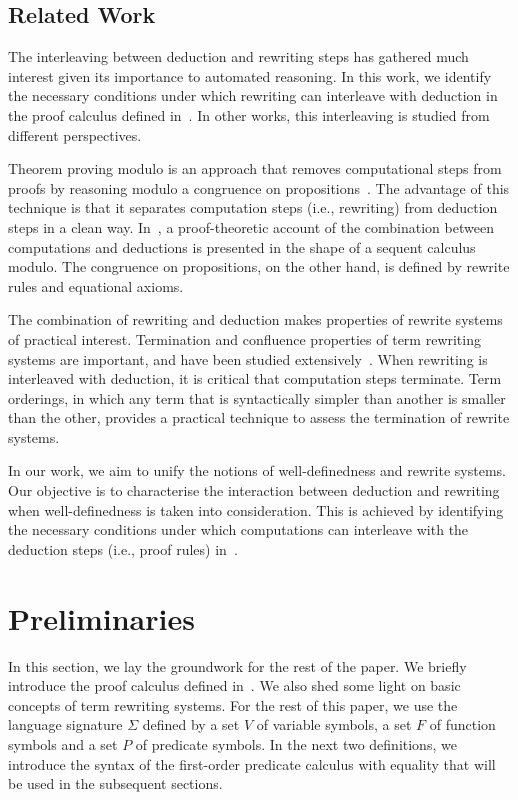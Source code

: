 \documentclass[copyright]{eptcs}
\begin{document}
\subsection{Related Work}
The interleaving between deduction and rewriting steps has gathered much interest given its importance to automated reasoning. In this work, we identify the necessary conditions under which rewriting can interleave with deduction in the proof calculus defined in~\cite{icfemMehta08}. In other works, this interleaving is studied from different perspectives.
\par
Theorem proving modulo is an approach that removes computational steps from proofs by reasoning modulo a congruence on propositions~\cite{949773}. The advantage of this technique is that it separates computation steps (i.e., rewriting) from deduction steps in a clean way. In~\cite{949773}, a proof-theoretic account of the combination between computations and deductions is presented in the shape of a sequent calculus modulo. The congruence on propositions, on the other hand, is defined by rewrite rules and equational axioms.
\par
The combination of rewriting and deduction makes properties of rewrite systems of practical interest. Termination and confluence properties of term rewriting systems are important, and have been studied extensively~\cite{280474,303448}. When rewriting is interleaved with deduction, it is critical that computation steps terminate. Term orderings, in which any term that is syntactically simpler than another is smaller than the other, provides a practical technique to assess the termination of rewrite systems.
\par
In our work, we aim to unify the notions of well-definedness and rewrite systems. Our objective is to characterise the interaction between deduction and rewriting when well-definedness is taken into consideration. This is achieved by identifying the necessary conditions under which computations can interleave with the deduction steps (i.e., proof rules) in~\cite{icfemMehta08}.

\section{Preliminaries}\label{pre}
In this section, we lay the groundwork for the rest of the paper. We briefly introduce the proof calculus defined in~\cite{icfemMehta08}. We also shed some light on basic concepts of term rewriting systems. For the rest of this paper, we use the language signature $\Sigma$ defined by a set $V$ of variable symbols, a set $F$ of function symbols and a set $P$ of predicate symbols. In the next two definitions, we introduce the syntax of the first-order predicate calculus with equality that will be used in the subsequent sections.
\end{document}
